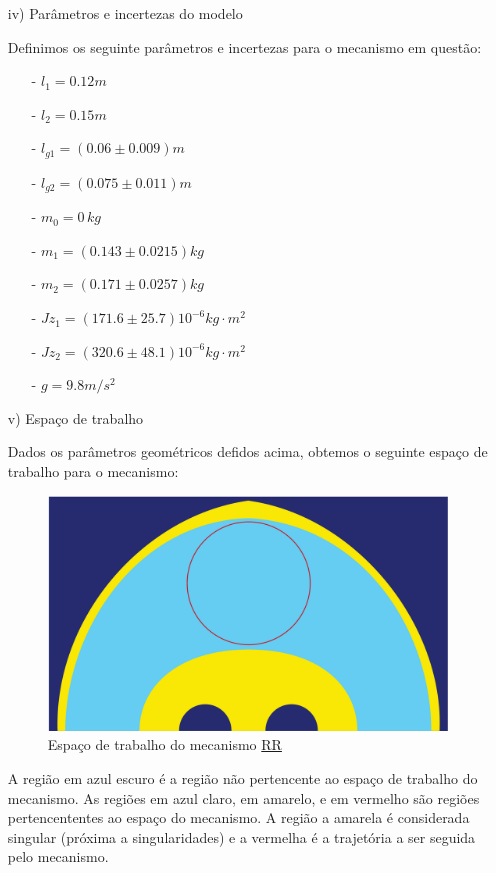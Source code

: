 \documentclass[]{politex}
\begin{document}
\begin{itemize}
\item[iv)] Parâmetros e incertezas do modelo

Definimos os seguinte parâmetros e incertezas para o mecanismo em questão:

\begin{multicols}{2}
\begin{itemize}
\item[-] $l_1 = 0.12 m$
\item[-] $l_2 = 0.15 m$
\item[-] $l_{g1} = (0.06 \pm 0.009) m$
\item[-] $l_{g2} = (0.075 \pm 0.011) m$
\item[-] $m_0 = 0 \, kg$
\item[-] $m_1 = (0.143 \pm 0.0215) kg$
\item[-] $m_2 = (0.171 \pm 0.0257) kg$
\item[-] $Jz_1 = (171.6 \pm 25.7 ) 10^{-6} kg\cdot m^2$
\item[-] $Jz_2 = (320.6 \pm 48.1 ) 10^{-6} kg\cdot m^2$
\item[-] $g = 9.8 m/s^2$
\end{itemize}
\end{multicols}

\item[v)] Espaço de trabalho

Dados os parâmetros geométricos defidos acima, obtemos o seguinte espaço de trabalho para o mecanismo:

\begin{figure}[h]
	\centering
	\includegraphics[scale=0.25]{../figures/Workspace.pdf}  
	\caption{Espaço de trabalho do mecanismo \underline{R}\underline{R}}
	\label{fig:RRWS}
\end{figure}

A região em azul escuro é a região não pertencente ao espaço de trabalho do mecanismo. As regiões em azul claro, em amarelo, e em vermelho são regiões pertencententes ao espaço do mecanismo. A região a amarela é considerada singular (próxima a singularidades) e a vermelha é a trajetória a ser seguida pelo mecanismo.


\end{itemize}
\end{document}
